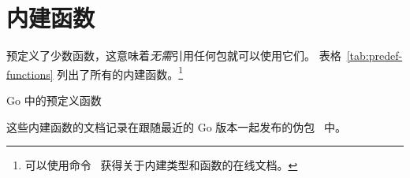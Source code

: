 \section{内建函数}
预定义了少数函数，这意味着\emph{无需}引用任何包就可以使用它们。
表格~\ref{tab:predef-functions} 列出了所有的内建函数。\footnote{可以使用命令~
 获得关于内建类型和函数的在线文档。}

\begin{table}[H]
\begin{center}
\caption{Go 中的预定义函数}
\label{tab:predef-functions}

\end{center}
\end{table}

这些内建函数的文档记录在跟随最近的 Go 版本一起发布的伪包~  中。

